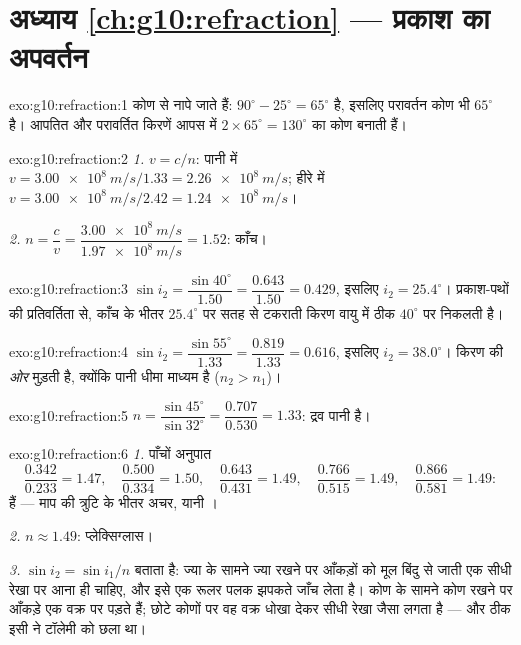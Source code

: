 \section*{अध्याय \ref{ch:g10:refraction} --- प्रकाश का अपवर्तन}

\begin{solution}{exo:g10:refraction:1}
कोण  से नापे जाते हैं:  $90^\circ - 25^\circ = 65^\circ$ है, इसलिए
परावर्तन कोण भी $65^\circ$ है। आपतित और परावर्तित किरणें आपस में $2 \times 65^\circ = 130^\circ$ का
कोण बनाती हैं।
\end{solution}

\begin{solution}{exo:g10:refraction:2}
\emph{1.} $v = c/n$: पानी में $v = \qty{3.00e8}{m/s}/1.33 = \qty{2.26e8}{m/s}$; हीरे में $v = \qty{3.00e8}{m/s}/2.42 = \qty{1.24e8}{m/s}$।

\emph{2.} $n = \dfrac{c}{v} = \dfrac{\qty{3.00e8}{m/s}}
{\qty{1.97e8}{m/s}} = 1.52$: काँच।
\end{solution}

\begin{solution}{exo:g10:refraction:3}
$\sin i_2 = \dfrac{\sin 40^\circ}{1.50} = \dfrac{0.643}{1.50} = 0.429$, इसलिए $i_2 = 25.4^\circ$। प्रकाश-पथों की प्रतिवर्तिता से, काँच के भीतर
$25.4^\circ$ पर सतह से टकराती किरण वायु में ठीक $40^\circ$ पर निकलती है।
\end{solution}

\begin{solution}{exo:g10:refraction:4}
$\sin i_2 = \dfrac{\sin 55^\circ}{1.33} = \dfrac{0.819}{1.33} = 0.616$, इसलिए $i_2 = 38.0^\circ$। किरण  की \emph{ओर} मुड़ती है,
क्योंकि पानी धीमा माध्यम है ($n_2 > n_1$)।
\end{solution}

\begin{solution}{exo:g10:refraction:5}
$n = \dfrac{\sin 45^\circ}{\sin 32^\circ} = \dfrac{0.707}{0.530}
= 1.33$: द्रव पानी है।
\end{solution}

\begin{solution}{exo:g10:refraction:6}
\emph{1.} पाँचों अनुपात
\[
\frac{0.342}{0.233} = 1.47,\quad
\frac{0.500}{0.334} = 1.50,\quad
\frac{0.643}{0.431} = 1.49,\quad
\frac{0.766}{0.515} = 1.49,\quad
\frac{0.866}{0.581} = 1.49 :
\]
हैं --- माप की त्रुटि के भीतर अचर, यानी ।

\emph{2.} $n \approx 1.49$: प्लेक्सिग्लास।

\emph{3.}  $\sin i_2 = \sin i_1 / n$ बताता है: ज्या के सामने ज्या
रखने पर आँकड़ों को मूल बिंदु से जाती एक सीधी रेखा पर आना ही चाहिए, और
इसे एक रूलर पलक झपकते जाँच लेता है। कोण के सामने कोण रखने पर आँकड़े एक
वक्र पर पड़ते हैं; छोटे कोणों पर वह वक्र धोखा देकर सीधी रेखा जैसा लगता
है --- और ठीक इसी ने टॉलेमी को छला था।
\end{solution}

